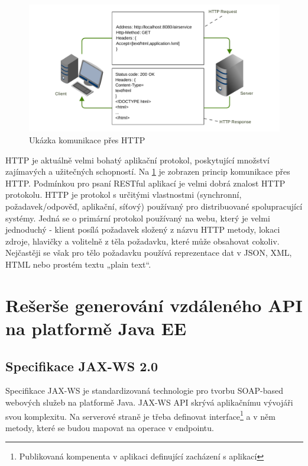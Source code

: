 \documentclass[11pt,twoside,a4paper]{book}
\begin{document}
\begin{figure}[h]
\begin{center}
\includegraphics[width=13cm]{images-pdf/http.pdf}
\caption{Ukázka komunikace přes HTTP}
\label{fig:http-komunikace}
\end{center}
\end{figure}

HTTP je aktuálně velmi bohatý aplikační protokol, poskytující množství zajímavých a
užitečných schopností. Na \ref{fig:http-komunikace} je zobrazen princip
komunikace přes HTTP. Podmínkou pro psaní RESTful aplikací je velmi dobrá
znalost HTTP protokolu.
HTTP je protokol s určitými vlastnostmi (synchronní, požadavek/odpověď, aplikační, síťový) používaný pro distribuované spolupracující systémy. Jedná se o primární
protokol používaný na webu, který je velmi jednoduchý - klient posílá požadavek složený z
názvu HTTP metody, lokaci zdroje, hlavičky a volitelně z těla požadavku, které může
obsahovat cokoliv. Nejčastěji se však pro tělo požadavku používá reprezentace dat v JSON,
XML, HTML nebo prostém textu „plain text“.

\section{Rešerše generování vzdáleného API na platformě Java EE}

\subsection{Specifikace JAX-WS 2.0} 
\label{subsec:specifikace-jax-ws}

Specifikace JAX-WS \cite{JAXWS20} je standardizovaná technologie pro tvorbu SOAP-based
webových služeb na platformě Java. JAX-WS API skrývá aplikačnímu vývojáři svou
komplexitu.
Na serverové straně je třeba definovat interface\footnote{Publikovaná kompenenta
v aplikaci definující zacházení s aplikací} a v něm metody, které se budou
mapovat na operace v endpointu.
\end{document}
